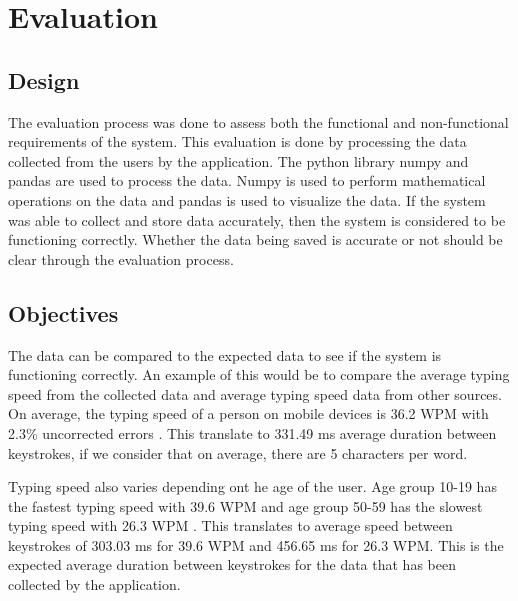 \chapter{Evaluation}


\section{Design}


The evaluation process was done to assess both the functional and non-functional requirements of the system.
This evaluation is done by processing the data collected from the users by the application.
The python library numpy and pandas are used to process the data.
Numpy is used to perform mathematical operations on the data and pandas is used to visualize the data.
If the system was able to collect and store data accurately, then the system is considered to be functioning correctly.
Whether the data being saved is accurate or not should be clear through the evaluation process.

\section{Objectives}


The data can be compared to the expected data to see if the system is functioning correctly.
An example of this would be to compare the average typing speed from the collected data and average typing speed data from other sources.
On average, the typing speed of a person on mobile devices is 36.2 \ac{WPM} with 2.3\% uncorrected errors \cite{Palin2019}.
This translate to 331.49 ms average duration between keystrokes, if we consider that on average, there are 5 characters per word.

Typing speed also varies depending ont he age of the user.
Age group 10-19 has the fastest typing speed with 39.6 \ac{WPM} and age group 50-59 has the slowest typing speed with 26.3 \ac{WPM} \cite{Palin2019}.
This translates to average speed between keystrokes of 303.03 ms for 39.6 \ac{WPM} and 456.65 ms for 26.3 \ac{WPM}.
This is the expected average duration between keystrokes for the data that has been collected by the application.

